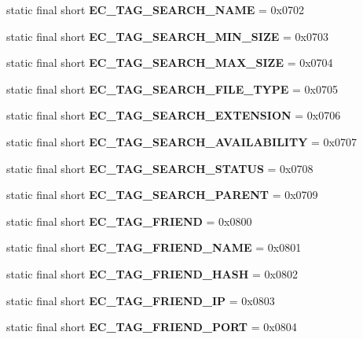 \begin{DoxyCompactItemize}
\item 
static final short {\bfseries EC\_\-TAG\_\-SEARCH\_\-NAME} = 0x0702\label{interfaceECCodes_a42220249e0833d52dc5585197c593f87}

\item 
static final short {\bfseries EC\_\-TAG\_\-SEARCH\_\-MIN\_\-SIZE} = 0x0703\label{interfaceECCodes_ab29c6248d757f9b64f919128542bdf62}

\item 
static final short {\bfseries EC\_\-TAG\_\-SEARCH\_\-MAX\_\-SIZE} = 0x0704\label{interfaceECCodes_a7b25a51ada2ba72e79ae786e50221117}

\item 
static final short {\bfseries EC\_\-TAG\_\-SEARCH\_\-FILE\_\-TYPE} = 0x0705\label{interfaceECCodes_acfa60a8ab4a71c92ad8023b6fd8c780d}

\item 
static final short {\bfseries EC\_\-TAG\_\-SEARCH\_\-EXTENSION} = 0x0706\label{interfaceECCodes_a4de08986c43bef48662ae1fa1a8c8fb4}

\item 
static final short {\bfseries EC\_\-TAG\_\-SEARCH\_\-AVAILABILITY} = 0x0707\label{interfaceECCodes_adf08d7ccacbb1dcdb2c310cf0fc218af}

\item 
static final short {\bfseries EC\_\-TAG\_\-SEARCH\_\-STATUS} = 0x0708\label{interfaceECCodes_aab4e18fa4d3ce8b24daf3077e582dc71}

\item 
static final short {\bfseries EC\_\-TAG\_\-SEARCH\_\-PARENT} = 0x0709\label{interfaceECCodes_a7f44120313d42711401062a99334a812}

\item 
static final short {\bfseries EC\_\-TAG\_\-FRIEND} = 0x0800\label{interfaceECCodes_afa30c732151ed0253181dc35b1b458fb}

\item 
static final short {\bfseries EC\_\-TAG\_\-FRIEND\_\-NAME} = 0x0801\label{interfaceECCodes_ad97f3fc5c5c944f31848929bf3f777b9}

\item 
static final short {\bfseries EC\_\-TAG\_\-FRIEND\_\-HASH} = 0x0802\label{interfaceECCodes_a109a4b6aa5fbd5f8daaf26d3864d6819}

\item 
static final short {\bfseries EC\_\-TAG\_\-FRIEND\_\-IP} = 0x0803\label{interfaceECCodes_a5ed08e28ac6667e3dad38b6b49654402}

\item 
static final short {\bfseries EC\_\-TAG\_\-FRIEND\_\-PORT} = 0x0804\label{interfaceECCodes_aca904d4464c2dca6a9003300ac12b918}


\end{DoxyCompactItemize}
